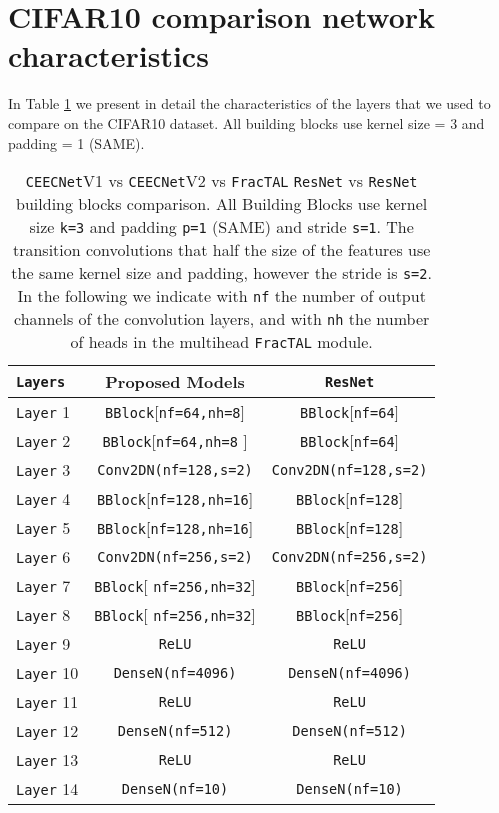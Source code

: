 \documentclass[times, 5p]{elsarticle}
\def \FracTAL {\texttt{FracTAL} }
\newcommand{\ceecnet}{\texttt{CEECNet}}
\begin{document}


\appendix 

\section{CIFAR10 comparison network characteristics}
In Table \ref{ceecnet_vs_resnet} we present in detail the characteristics of the layers that we used to compare on the CIFAR10 dataset. All building blocks use kernel size = 3 and padding = 1 (SAME). 

\begin{table}
\footnotesize
\caption{\ceecnet{}V1 vs \ceecnet{}V2 vs \FracTAL \texttt{ResNet} vs \texttt{ResNet} building blocks comparison. All Building Blocks use kernel size \texttt{k=3} and padding \texttt{p=1} (SAME) and stride \texttt{s=1}. The transition convolutions that half the size of the features use the same kernel size and padding, however the stride  is \texttt{s=2}. In the following we indicate with \texttt{nf} the number of output channels of the convolution layers, and with \texttt{nh} the number of heads in the multihead \FracTAL module.}
\label{ceecnet_vs_resnet}
\begin{center}
\begin{tabular}{|l |c|c| }
\hline
\texttt{Layers} & Proposed Models & \texttt{ResNet} \\\hline\hline
\texttt{Layer} 1 & \texttt{BBlock}[\texttt{nf=64,nh=8}]  & \texttt{BBlock}[\texttt{nf=64}]  \\\hline
\texttt{Layer} 2 & \texttt{BBlock}[\texttt{nf=64,nh=8} ]   & \texttt{BBlock}[\texttt{nf=64}] \\\hline
\texttt{Layer} 3 & \texttt{Conv2DN(nf=128,s=2)} & \texttt{Conv2DN(nf=128,s=2)} \\\hline
\texttt{Layer} 4 & \texttt{BBlock}[\texttt{nf=128,nh=16}]  & \texttt{BBlock}[\texttt{nf=128}] \\\hline
\texttt{Layer} 5 & \texttt{BBlock}[\texttt{nf=128,nh=16}]  & \texttt{BBlock}[\texttt{nf=128}]\\\hline
\texttt{Layer} 6 & \texttt{Conv2DN(nf=256,s=2)} & \texttt{Conv2DN(nf=256,s=2)} \\\hline
\texttt{Layer} 7 &\texttt{BBlock}[ \texttt{nf=256,nh=32}] & \texttt{BBlock}[\texttt{nf=256}]\\\hline
\texttt{Layer} 8 &\texttt{BBlock}[ \texttt{nf=256,nh=32}] &\texttt{BBlock}[\texttt{nf=256}]\\\hline
\texttt{Layer} 9 & \texttt{ReLU}  & \texttt{ReLU} \\\hline
\texttt{Layer} 10 & \texttt{DenseN(nf=4096)} & \texttt{DenseN(nf=4096)}\\\hline
\texttt{Layer} 11 & \texttt{ReLU}  & \texttt{ReLU} \\\hline
\texttt{Layer} 12 & \texttt{DenseN(nf=512)}  & \texttt{DenseN(nf=512)}\\\hline
\texttt{Layer} 13 & \texttt{ReLU}  & \texttt{ReLU} \\\hline
\texttt{Layer} 14 & \texttt{DenseN(nf=10)}  & \texttt{DenseN(nf=10)}\\\hline
\end{tabular}
\end{center}
\end{table}
\end{document}
